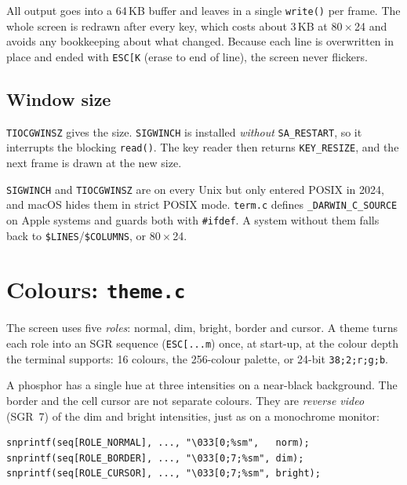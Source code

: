 \documentclass[11pt]{article}
\begin{document}
All output goes into a 64\,KB buffer and leaves in a single
\texttt{write()} per frame. The whole screen is redrawn after every key,
which costs about 3\,KB at 80\,\(\times\)\,24 and avoids any bookkeeping
about what changed. Because each line is overwritten in place and ended
with \texttt{ESC[K} (erase to end of line), the screen never flickers.

\subsection{Window size}

\texttt{TIOCGWINSZ} gives the size. \texttt{SIGWINCH} is installed
\emph{without} \texttt{SA\_RESTART}, so it interrupts the blocking
\texttt{read()}. The key reader then returns \texttt{KEY\_RESIZE}, and the
next frame is drawn at the new size.

\begin{note}[Portability]
\texttt{SIGWINCH} and \texttt{TIOCGWINSZ} are on every Unix but only
entered POSIX in 2024, and macOS hides them in strict POSIX mode.
\texttt{term.c} defines \texttt{\_DARWIN\_C\_SOURCE} on Apple systems and
guards both with \texttt{\#ifdef}. A system without them falls back to
\texttt{\$LINES}/\texttt{\$COLUMNS}, or 80\,\(\times\)\,24.
\end{note}

\section{Colours: \texttt{theme.c}}

The screen uses five \emph{roles}: normal, dim, bright, border and cursor.
A theme turns each role into an SGR sequence (\texttt{ESC[...m}) once, at
start-up, at the colour depth the terminal supports: 16 colours, the
256-colour palette, or 24-bit \texttt{38;2;r;g;b}.

A phosphor has a single hue at three intensities on a near-black
background. The border and the cell cursor are not separate colours. They
are \emph{reverse video} (SGR~7) of the dim and bright intensities, just as
on a monochrome monitor:

\begin{lstlisting}[style=c]
snprintf(seq[ROLE_NORMAL], ..., "\033[0;%sm",   norm);
snprintf(seq[ROLE_BORDER], ..., "\033[0;7;%sm", dim);
snprintf(seq[ROLE_CURSOR], ..., "\033[0;7;%sm", bright);
\end{lstlisting}
\end{document}
